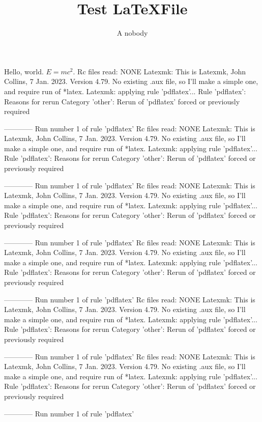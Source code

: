 \documentclass[a4paper]{article}
\title{Test \LaTeX File}
\author{A nobody}
\begin{document}
\maketitle
Hello, world. $E=mc^2$.
Rc files read: 
  NONE
Latexmk: This is Latexmk, John Collins, 7 Jan. 2023. Version 4.79.
No existing .aux file, so I'll make a simple one, and require run of *latex.
Latexmk: applying rule 'pdflatex'...
Rule 'pdflatex':  Reasons for rerun
Category 'other':
  Rerun of 'pdflatex' forced or previously required

------------
Run number 1 of rule 'pdflatex'
Rc files read:
  NONE
Latexmk: This is Latexmk, John Collins, 7 Jan. 2023. Version 4.79.
No existing .aux file, so I'll make a simple one, and require run of *latex.
Latexmk: applying rule 'pdflatex'...
Rule 'pdflatex':  Reasons for rerun
Category 'other':
  Rerun of 'pdflatex' forced or previously required

------------
Run number 1 of rule 'pdflatex'
Rc files read:
  NONE
Latexmk: This is Latexmk, John Collins, 7 Jan. 2023. Version 4.79.
No existing .aux file, so I'll make a simple one, and require run of *latex.
Latexmk: applying rule 'pdflatex'...
Rule 'pdflatex':  Reasons for rerun
Category 'other':
  Rerun of 'pdflatex' forced or previously required

------------
Run number 1 of rule 'pdflatex'
Rc files read:
  NONE
Latexmk: This is Latexmk, John Collins, 7 Jan. 2023. Version 4.79.
No existing .aux file, so I'll make a simple one, and require run of *latex.
Latexmk: applying rule 'pdflatex'...
Rule 'pdflatex':  Reasons for rerun
Category 'other':
  Rerun of 'pdflatex' forced or previously required

------------
Run number 1 of rule 'pdflatex'
Rc files read:
  NONE
Latexmk: This is Latexmk, John Collins, 7 Jan. 2023. Version 4.79.
No existing .aux file, so I'll make a simple one, and require run of *latex.
Latexmk: applying rule 'pdflatex'...
Rule 'pdflatex':  Reasons for rerun
Category 'other':
  Rerun of 'pdflatex' forced or previously required

------------
Run number 1 of rule 'pdflatex'
Rc files read:
  NONE
Latexmk: This is Latexmk, John Collins, 7 Jan. 2023. Version 4.79.
No existing .aux file, so I'll make a simple one, and require run of *latex.
Latexmk: applying rule 'pdflatex'...
Rule 'pdflatex':  Reasons for rerun
Category 'other':
  Rerun of 'pdflatex' forced or previously required

------------
Run number 1 of rule 'pdflatex'
\end{document}
